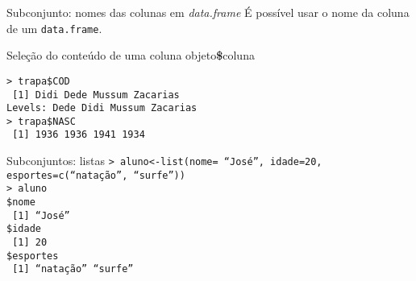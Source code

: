 \documentclass{beamer}
\begin{document}
\begin{frame}{Subconjunto: nomes das colunas em \textit{data.frame}}
  É possível usar o nome da coluna de  um \texttt{data.frame}. 
  \begin{block}{Seleção do  conteúdo de uma coluna}
   objeto\textbf{\$}coluna\\   
  \end{block}
\texttt{> trapa\$COD\\
~[1] Didi     Dede     Mussum   Zacarias\\
Levels: Dede Didi Mussum Zacarias\\
> trapa\$NASC\\
~[1] 1936 1936 1941 1934\\}
  \end{frame}



\begin{frame}{Subconjuntos: listas}
\texttt{> aluno<-list(nome= ``José'', idade=20, esportes=c(``natação'', ``surfe''))\\ \pause
> aluno\\
\$nome\\
~[1] ``José''\\
\vspace{10pt}
\$idade\\
~[1] 20\\
\vspace{10pt}
\$esportes\\
~[1] ``natação'' ``surfe''}
\end{frame}
\end{document}
